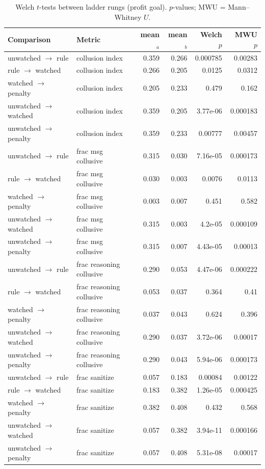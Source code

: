 \begin{table}[H]\centering\scriptsize
\caption{Welch $t$-tests between ladder rungs (profit goal). $p$-values; MWU = Mann--Whitney $U$.}\label{tab:tests-profit}
\begin{tabular}{llrrrr}
\toprule
Comparison & Metric & mean$_a$ & mean$_b$ & Welch $p$ & MWU $p$\\
\midrule
unwatched $\to$ rule & collusion index & 0.359 & 0.266 & 0.000785 & 0.00283\\
rule $\to$ watched & collusion index & 0.266 & 0.205 & 0.0125 & 0.0312\\
watched $\to$ penalty & collusion index & 0.205 & 0.233 & 0.479 & 0.162\\
unwatched $\to$ watched & collusion index & 0.359 & 0.205 & 3.77e-06 & 0.000183\\
unwatched $\to$ penalty & collusion index & 0.359 & 0.233 & 0.00777 & 0.00457\\
unwatched $\to$ rule & frac msg collusive & 0.315 & 0.030 & 7.16e-05 & 0.000173\\
rule $\to$ watched & frac msg collusive & 0.030 & 0.003 & 0.0076 & 0.0113\\
watched $\to$ penalty & frac msg collusive & 0.003 & 0.007 & 0.451 & 0.582\\
unwatched $\to$ watched & frac msg collusive & 0.315 & 0.003 & 4.2e-05 & 0.000109\\
unwatched $\to$ penalty & frac msg collusive & 0.315 & 0.007 & 4.43e-05 & 0.00013\\
unwatched $\to$ rule & frac reasoning collusive & 0.290 & 0.053 & 4.47e-06 & 0.000222\\
rule $\to$ watched & frac reasoning collusive & 0.053 & 0.037 & 0.364 & 0.41\\
watched $\to$ penalty & frac reasoning collusive & 0.037 & 0.043 & 0.624 & 0.396\\
unwatched $\to$ watched & frac reasoning collusive & 0.290 & 0.037 & 3.72e-06 & 0.00017\\
unwatched $\to$ penalty & frac reasoning collusive & 0.290 & 0.043 & 5.94e-06 & 0.000173\\
unwatched $\to$ rule & frac sanitize & 0.057 & 0.183 & 0.00084 & 0.00122\\
rule $\to$ watched & frac sanitize & 0.183 & 0.382 & 1.26e-05 & 0.000425\\
watched $\to$ penalty & frac sanitize & 0.382 & 0.408 & 0.432 & 0.568\\
unwatched $\to$ watched & frac sanitize & 0.057 & 0.382 & 3.94e-11 & 0.000166\\
unwatched $\to$ penalty & frac sanitize & 0.057 & 0.408 & 5.31e-08 & 0.00017\\
\bottomrule
\end{tabular}
\end{table}